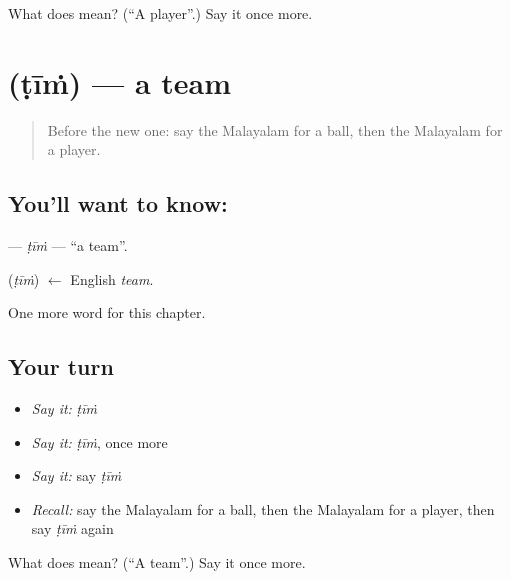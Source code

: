 \begin{tcolorbox}[breakable,colback=teal!4,colframe=teal!35!black,title={Before you move on}]
What does  mean? (\textquotedblleft{}A player\textquotedblright{}.) Say it once more.
\end{tcolorbox}
\section[\texorpdfstring{\ml{ടീം} (ṭīṁ)}{ടീം (ṭīṁ)}]{ (ṭīṁ) — a team}

\label{lesson:ML-C215-tim}



\begin{quote}
Before the new one: say the Malayalam for a ball, then the Malayalam for a player.
\end{quote}

\subsection*{You'll want to know: }
\textbf{} — \emph{ṭīṁ} — \textquotedblleft{}a team\textquotedblright{}.

\begin{cousinweb}
\textbf{} (\emph{ṭīṁ}) $\leftarrow$ English \emph{team}.
\end{cousinweb}

\begin{grammarlens}[title={What you've built}]
One more word for this chapter.
\end{grammarlens}

\subsection*{Your turn}
\begin{itemize}
\raggedright
  \item \emph{Say it:} \emph{ṭīṁ}
  \item \emph{Say it:} \emph{ṭīṁ}, once more
  \item \emph{Say it:} say \emph{ṭīṁ}
  \item \emph{Recall:} say the Malayalam for a ball, then the Malayalam for a player, then say \emph{ṭīṁ} again
\end{itemize}

\begin{tcolorbox}[breakable,colback=teal!4,colframe=teal!35!black,title={Before you move on}]
What does  mean? (\textquotedblleft{}A team\textquotedblright{}.) Say it once more.
\end{tcolorbox}
